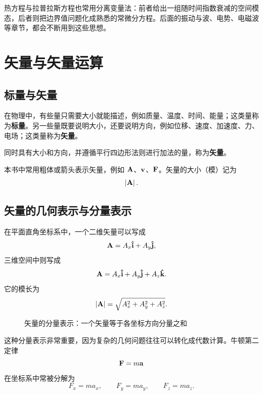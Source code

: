 \begin{remark}
热方程与拉普拉斯方程也常用分离变量法：前者给出一组随时间指数衰减的空间模态，后者则把边界值问题化成熟悉的常微分方程。后面的振动与波、电势、电磁波等章节，都会不断用到这些思想。
\end{remark}

\section{矢量与矢量运算}

\subsection{标量与矢量}

在物理中，有些量只需要大小就能描述，例如质量、温度、时间、能量；这类量称为\textbf{标量}。另一些量既要说明大小，还要说明方向，例如位移、速度、加速度、力、电场；这类量称为\textbf{矢量}。

\begin{definition}
同时具有大小和方向，并遵循平行四边形法则进行加法的量，称为\textbf{矢量}。
\end{definition}

本书中常用粗体或箭头表示矢量，例如 $\vb{A}$、$\vb{v}$、$\vb{F}$。矢量的大小（模）记为
\[
  \left|\vb{A}\right|.
\]

\subsection{矢量的几何表示与分量表示}

在平面直角坐标系中，一个二维矢量可以写成
\[
  \vb{A}=A_x\vu{i}+A_y\vu{j},
\]
三维空间中则写成
\[
  \vb{A}=A_x\vu{i}+A_y\vu{j}+A_z\vu{k}.
\]
它的模长为
\[
  \left|\vb{A}\right| = \sqrt{A_x^2 + A_y^2 + A_z^2}.
\]

\begin{figure}[H]
  \centering
  \caption{矢量的分量表示：一个矢量等于各坐标方向分量之和}
\end{figure}

这种分量表示非常重要，因为复杂的几何问题往往可以转化成代数计算。牛顿第二定律
\[
  \vb{F}=m\vb{a}
\]
在坐标系中常被分解为
\[
  F_x=ma_x, \qquad F_y=ma_y, \qquad F_z=ma_z.
\]

